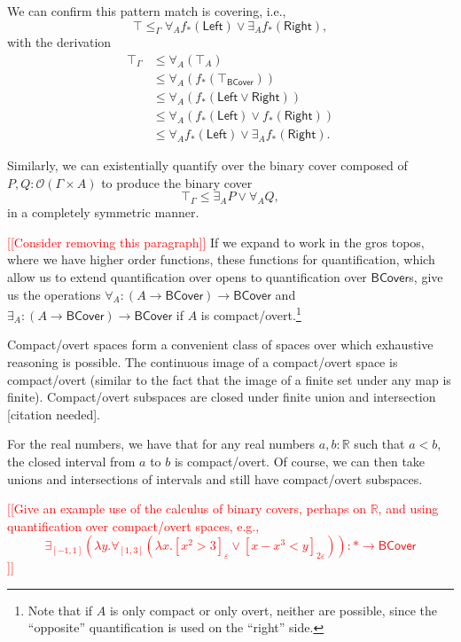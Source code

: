 \documentclass[conference]{IEEEtran}
\newcommand{\R}{\mathbb{R}}
\newcommand{\One}{\ast}
\newcommand{\Open}[1]{\mathcal{O}({#1})}
\newcommand{\note}[1]{\textcolor{red}{[[{#1}]]}}
\begin{document}
We can confirm this pattern match is covering, i.e.,
\[
\top \le_\Gamma \forall_A f_*(\mathsf{Left}) \vee \exists_A f_*(\mathsf{Right}),
\]
with the derivation
\begin{align*}
\top_\Gamma 
  &\le \forall_A (\top_A) \tag{$\forall_A$ adjointness}
\\ &\le \forall_A (f_*(\top_\mathsf{BCover})) \tag{$f_*$ preserves $\top$}
\\ &\le \forall_A (f_*(\mathsf{Left} \vee \mathsf{Right}))
\\ &\le \forall_A(f_*(\mathsf{Left}) \vee f_*(\mathsf{Right}))  \tag{$f_*$ preserves joins}
\\ &\le \forall_A f_*(\mathsf{Left}) \vee \exists_A f_*(\mathsf{Right}) \tag{$A$ is compact/overt}.
\end{align*}

Similarly, we can existentially quantify over the binary cover composed of $P, Q : \Open{\Gamma \times A}$ to produce the binary cover
\[
\top_\Gamma \le \exists_A P \vee \forall_A Q,
\]
in a completely symmetric manner.

\note{Consider removing this paragraph} If we expand to work in the gros topos, where we have higher order functions, these functions for quantification, which allow us to extend quantification over opens to quantification over $\mathsf{BCover}$s, give us the operations $\forall_A : (A \to \mathsf{BCover}) \to \mathsf{BCover}$ and $\exists_A : (A \to \mathsf{BCover}) \to \mathsf{BCover}$ if $A$ is compact/overt.\footnote{Note that if $A$ is only compact or only overt, neither are possible, since the ``opposite'' quantification is used on the ``right'' side.}

Compact/overt spaces form a convenient class of spaces over which exhaustive reasoning is possible. The continuous image of a compact/overt space is compact/overt (similar to the fact that the image of a finite set under any map is finite). Compact/overt subspaces are closed under finite union and intersection [citation needed].

For the real numbers, we have that for any real numbers $a, b : \R$ such that $a < b$, the closed interval from $a$ to $b$ is compact/overt. Of course, we can then take unions and intersections of intervals and still have compact/overt subspaces.

\note{Give an example use of the calculus of binary covers, perhaps on $\R$, and using quantification over compact/overt spaces, e.g.,
\[
\exists_{[-1,1]}(\lambda y. \forall_{[1,3]} (\lambda x. [x^2 > 3]_\varepsilon \vee [x -x^3 < y]_{2\varepsilon})) : \One \to \mathsf{BCover}
\]}
\end{document}
